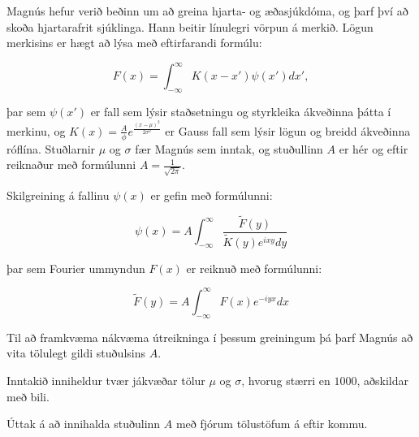 
Magnús hefur verið beðinn um að greina hjarta- og æðasjúkdóma, og þarf því að
skoða hjartarafrit sjúklinga. Hann beitir línulegri vörpun á merkið. Lögun
merkisins er hægt að lýsa með eftirfarandi formúlu:

$$F(x) = \int_{-\infty}^{\infty} K (x - x') \psi(x')dx',$$

þar sem $\psi(x')$ er fall sem lýsir staðsetningu og styrkleika ákveðinna þátta
í merkinu, og $K(x) = \frac{A}{\phi} e^{\frac{(x-\mu)^2}{2\sigma^2}}$ er Gauss
fall sem lýsir lögun og breidd ákveðinna róflína. Stuðlarnir $\mu$ og $\sigma$
fær Magnús sem inntak, og stuðullinn $A$ er hér og eftir reiknaður með
formúlunni $A = \frac{1}{\sqrt{2\pi}}$.

Skilgreining á fallinu $\psi(x)$ er gefin með formúlunni:

$$\psi(x) = A\int_{-\infty}^{\infty} \frac{\tilde{F}(y)}{\tilde{K}(y)e^{ixy}dy}$$

þar sem Fourier ummyndun $F(x)$ er reiknuð með formúlunni:

$$\tilde{F}(y) = A\int_{-\infty}^{\infty} F(x) e^{-iyx}dx$$

Til að framkvæma nákvæma útreikninga í þessum greiningum þá þarf Magnús að vita
tölulegt gildi stuðulsins $A$.

Inntakið inniheldur tvær jákvæðar tölur $\mu$ og $\sigma$, hvorug stærri en $1000$, aðskildar með bili.

Úttak á að innihalda stuðulinn $A$ með fjórum tölustöfum á eftir kommu.

